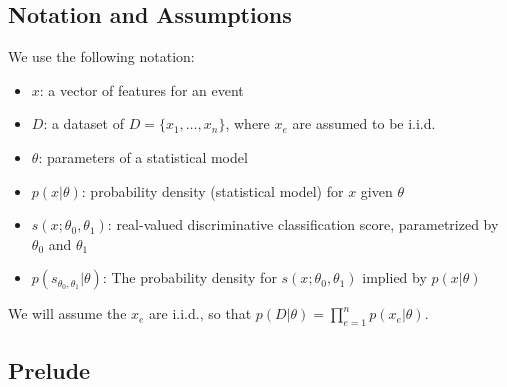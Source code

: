 \documentclass{article} %
\begin{document}

  

\subsection{Notation and Assumptions}

We use the following notation:
\begin{itemize}
 \item $x$: a vector of features for an event
 \item $D$: a dataset of $D=\{x_1, \dots, x_n\}$, where $x_e$ are assumed to be i.i.d.
 \item $\theta$: parameters of a statistical model
\item $p(x| \theta)$:  probability density  (statistical model) for $x$ given $\theta$
\item $s(x;\theta_0, \theta_1)$: real-valued discriminative classification score, parametrized by $\theta_0$ and $\theta_1$
\item $p( s_{\theta_0, \theta_1} | \theta )$: The probability density  for $s(x; \theta_0, \theta_1)$ implied by $p(x|\theta)$ \end{itemize}
We will assume the $x_e$ are i.i.d., so that $p(D|\theta) = \prod_{e=1}^n p(x_e | \theta)$.

\subsection{Prelude}
\end{document}
